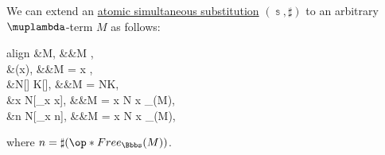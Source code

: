 \begin{algorithm}\label{alg:lambda_term_substitution}\mimprovised
  We can extend an \hyperref[def:atomic_lambda_term_substitution]{atomic simultaneous substitution} \( (\Bbbs, \sharp) \) to an arbitrary \( \muplambda \)-term \( M \) as follows:
  \begin{empheq}[left={M[\Bbbs]} \coloneqq \empheqlbrace]{align}
    &M,                              &&M \in {},                                   \label{eq:alg:lambda_term_substitution/const}               \\
    &\Bbbs(x),                       &&M = x \in {},                                 \label{eq:alg:lambda_term_substitution/var}                 \\
    &N[\Bbbs] \thinspace K[\Bbbs],   &&M = NK,                                              \label{eq:alg:lambda_term_substitution/application}         \\
    &\qabs x N[\Bbbs_{x \mapsto x}], &&M = \qabs x N  x \notin {}_\Bbbs(M), \label{eq:alg:lambda_term_substitution/abstraction/direct}  \\
    &\qabs n N[\Bbbs_{x \mapsto n}], &&M = \qabs x N  x \in {}_\Bbbs(M),     \label{eq:alg:lambda_term_substitution/abstraction/renaming}
  \end{empheq}
  where \( n = \sharp(\op*{Free}_\Bbbs(M)) \).
\end{algorithm}
